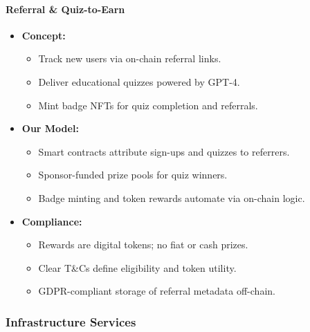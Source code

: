 \documentclass[13pt]{extarticle}
\begin{document}
\paragraph{Referral \& Quiz-to-Earn}
\begin{itemize}[left=1em]
  \item \textbf{Concept:}
    \begin{itemize}[left=1.2em]
      \item Track new users via on-chain referral links.
      \item Deliver educational quizzes powered by GPT-4.
      \item Mint badge NFTs for quiz completion and referrals.
    \end{itemize}
  \item \textbf{Our Model:}
    \begin{itemize}[left=1.2em]
      \item Smart contracts attribute sign-ups and quizzes to referrers.
      \item Sponsor-funded prize pools for quiz winners.
      \item Badge minting and token rewards automate via on-chain logic.
    \end{itemize}
  \item \textbf{Compliance:}
    \begin{itemize}[left=1.2em]
      \item Rewards are digital tokens; no fiat or cash prizes.
      \item Clear T\&Cs define eligibility and token utility.
      \item GDPR-compliant storage of referral metadata off-chain.
    \end{itemize}
\end{itemize}

\subsubsection{Infrastructure Services}
\end{document}
